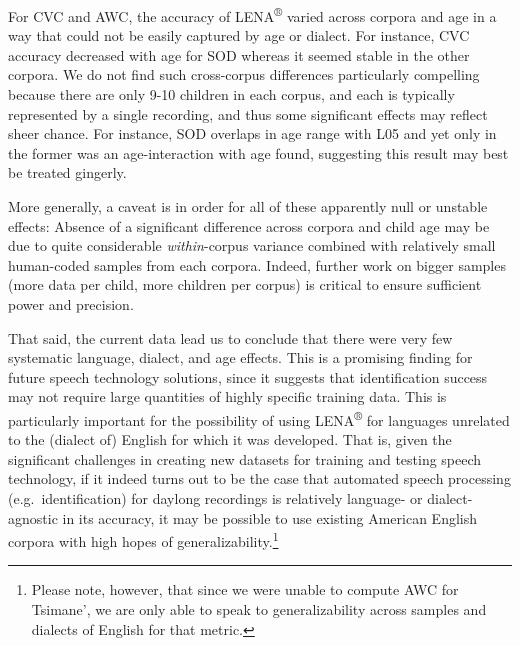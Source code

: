 \documentclass[english,table,man,floatsintext]{apa6}
\let\rmarkdownfootnote\footnote%
\def\footnote{\protect\rmarkdownfootnote}
\begin{document}
For CVC and AWC, the accuracy of LENA\textsuperscript{®} varied across
corpora and age in a way that could not be easily captured by age or
dialect. For instance, CVC accuracy decreased with age for SOD whereas
it seemed stable in the other corpora. We do not find such cross-corpus
differences particularly compelling because there are only 9-10 children
in each corpus, and each is typically represented by a single recording,
and thus some significant effects may reflect sheer chance. For
instance, SOD overlaps in age range with L05 and yet only in the former
was an age-interaction with age found, suggesting this result may best
be treated gingerly.

More generally, a caveat is in order for all of these apparently null or
unstable effects: Absence of a significant difference across corpora and
child age may be due to quite considerable \emph{within}-corpus variance
combined with relatively small human-coded samples from each corpora.
Indeed, further work on bigger samples (more data per child, more
children per corpus) is critical to ensure sufficient power and
precision.

That said, the current data lead us to conclude that there were very few
systematic language, dialect, and age effects. This is a promising
finding for future speech technology solutions, since it suggests that
identification success may not require large quantities of highly
specific training data. This is particularly important for the
possibility of using LENA\textsuperscript{®} for languages unrelated to
the (dialect of) English for which it was developed. That is, given the
significant challenges in creating new datasets for training and testing
speech technology, if it indeed turns out to be the case that automated
speech processing (e.g.~identification) for daylong recordings is
relatively language- or dialect-agnostic in its accuracy, it may be
possible to use existing American English corpora with high hopes of
generalizability.\footnote{Please note, however, that since we were unable to compute AWC for Tsimane', we are only able to speak to generalizability across samples and dialects of English for that metric.}
\end{document}
